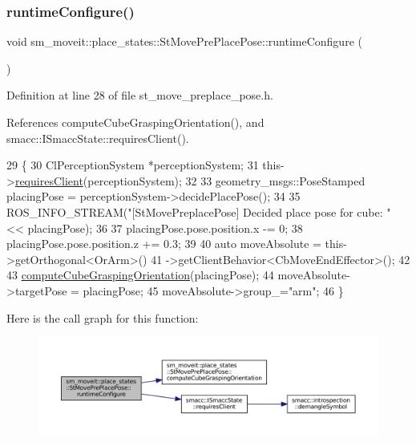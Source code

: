 \subsubsection{\texorpdfstring{runtime\+Configure()}{runtimeConfigure()}}
{\footnotesize\ttfamily void sm\+\_\+moveit\+::place\+\_\+states\+::\+St\+Move\+Pre\+Place\+Pose\+::runtime\+Configure (\begin{DoxyParamCaption}{ }\end{DoxyParamCaption})\hspace{0.3cm}{\ttfamily [inline]}}



Definition at line 28 of file st\+\_\+move\+\_\+preplace\+\_\+pose.\+h.



References compute\+Cube\+Grasping\+Orientation(), and smacc\+::\+I\+Smacc\+State\+::requires\+Client().


\begin{DoxyCode}
29     \{
30         ClPerceptionSystem *perceptionSystem;
31         this->\hyperlink{classsmacc_1_1ISmaccState_a7f95c9f0a6ea2d6f18d1aec0519de4ac}{requiresClient}(perceptionSystem);
32 
33         geometry\_msgs::PoseStamped placingPose = perceptionSystem->decidePlacePose();
34 
35         ROS\_INFO\_STREAM(\textcolor{stringliteral}{"[StMovePreplacePose] Decided place pose for cube: "} << placingPose);
36 
37         placingPose.pose.position.x -= 0;
38         placingPose.pose.position.z += 0.3;
39 
40         \textcolor{keyword}{auto} moveAbsolute = this->getOrthogonal<OrArm>()
41                                 ->getClientBehavior<CbMoveEndEffector>();
42 
43         \hyperlink{structsm__moveit_1_1place__states_1_1StMovePrePlacePose_add6f85ba0aa1e3905645881ecd0ba4e1}{computeCubeGraspingOrientation}(placingPose);
44         moveAbsolute->targetPose = placingPose;
45         moveAbsolute->group\_=\textcolor{stringliteral}{"arm"};
46     \}
\end{DoxyCode}
Here is the call graph for this function\+:
\nopagebreak
\begin{figure}[H]
\begin{center}
\leavevmode
\includegraphics[width=350pt]{structsm__moveit_1_1place__states_1_1StMovePrePlacePose_afb210c2d0b44f2df7904a40f66f9ef0b_cgraph}
\end{center}
\end{figure}
\mbox{\label{structsm__moveit_1_1place__states_1_1StMovePrePlacePose_a3dc8d058fe81bb5fe5db216d9ee506ba}} 
